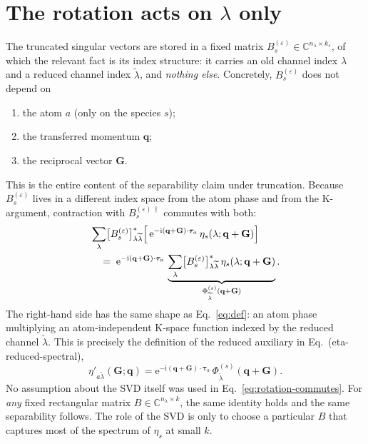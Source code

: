 \documentclass[aps,prb,reprint,superscriptaddress,nofootinbib]{revtex4-2}
\newcommand{\bG}{\mathbf G}
\newcommand{\bq}{\mathbf q}
\newcommand{\btau}{\boldsymbol\tau}
\newcommand{\ee}{\mathrm e}
\newcommand{\ii}{\mathrm i}
\begin{document}
\section{The rotation acts on \texorpdfstring{$\lambda$}{lambda} only}

The truncated singular vectors are stored in a fixed matrix
\(B_s^{(\varepsilon)}\in\mathbb C^{n_\lambda\times k_s}\), of which the
relevant fact is its index structure: it carries an old channel index
\(\lambda\) and a reduced channel index \(\widetilde\lambda\), and
\emph{nothing else}.  Concretely, \(B_s^{(\varepsilon)}\) does not
depend on
\begin{enumerate}
\item the atom \(a\) (only on the species \(s\));
\item the transferred momentum \(\bq\);
\item the reciprocal vector \(\bG\).
\end{enumerate}
This is the entire content of the separability claim under truncation.
Because \(B_s^{(\varepsilon)}\) lives in a different index space from
the atom phase and from the K-argument, contraction with
\(B_s^{(\varepsilon)\,\dagger}\) commutes with both:
\begin{align}
&\sum_\lambda\bigl[B_s^{(\varepsilon)}\bigr]^{*}_{\lambda\widetilde\lambda}
\Bigl[\,\ee^{-\ii(\bq+\bG)\cdot\btau_a}\,
\eta_s(\lambda;\bq+\bG)\Bigr] \notag\\
&\quad=\;\ee^{-\ii(\bq+\bG)\cdot\btau_a}\,
\underbrace{\sum_\lambda
\bigl[B_s^{(\varepsilon)}\bigr]^{*}_{\lambda\widetilde\lambda}\,
\eta_s(\lambda;\bq+\bG)}_{\Phi^{(s)}_{\widetilde\lambda}(\bq+\bG)}.
\label{eq:rotation-commutes}
\end{align}
The right-hand side has the same shape as Eq.~\eqref{eq:def}: an atom
phase multiplying an atom-independent K-space function indexed by the
reduced channel \(\widetilde\lambda\).  This is precisely the definition
of the reduced auxiliary in Eq.~(eta-reduced-spectral),
\begin{equation}
\eta'_{a\widetilde\lambda}(\bG;\bq)
=\ee^{-\ii(\bq+\bG)\cdot\btau_a}\,
\Phi^{(s)}_{\widetilde\lambda}(\bq+\bG).
\label{eq:reduced}
\end{equation}
No assumption about the SVD itself was used in
Eq.~\eqref{eq:rotation-commutes}.  For \emph{any} fixed rectangular
matrix \(B\in\mathbb C^{n_\lambda\times k}\), the same identity holds
and the same separability follows.  The role of the SVD is only to
choose a particular \(B\) that captures most of the spectrum of
\(\eta_s\) at small \(k\).
\end{document}
